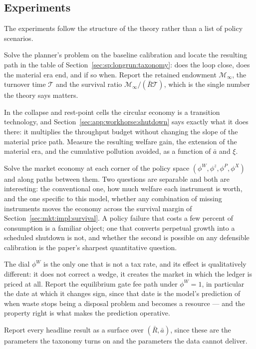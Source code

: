 \subsection{Experiments}\label{sec:q:cal:experiments}

The experiments follow the structure of the theory rather than a list of policy scenarios.

 Solve the planner's problem on the baseline calibration and locate the resulting path in the table of Section~\ref{sec:sp:longrun:taxonomy}: does the loop close, does the material era end, and if so when. Report the retained endowment $\mathcal M_\infty$, the turnover time $\mathcal T$ and the survival ratio $\mathcal M_\infty/\left(\bar R\mathcal T\right)$, which is the single number the theory says matters.

 In the collapse and rest-point cells the circular economy is a transition technology, and Section~\ref{sec:app:workhorse:shutdown} says exactly what it does there: it multiplies the throughput budget without changing the slope of the material price path. Measure the resulting welfare gain, the extension of the material era, and the cumulative pollution avoided, as a function of $\bar a$ and $\xi$.

 Solve the market economy at each corner of the policy space $\left(\phi^W,\phi^z,\phi^P,\phi^X\right)$ and along paths between them. Two questions are separable and both are interesting: the conventional one, how much welfare each instrument is worth, and the one specific to this model, whether any combination of missing instruments moves the economy across the survival margin of Section~\ref{sec:mkt:impl:survival}. A policy failure that costs a few percent of consumption is a familiar object; one that converts perpetual growth into a scheduled shutdown is not, and whether the second is possible on any defensible calibration is the paper's sharpest quantitative question.

 The dial $\phi^W$ is the only one that is not a tax rate, and its effect is qualitatively different: it does not correct a wedge, it creates the market in which the ledger is priced at all. Report the equilibrium gate fee path under $\phi^W=1$, in particular the date at which it changes sign, since that date is the model's prediction of when waste stops being a disposal problem and becomes a resource --- and the property right is what makes the prediction operative.

 Report every headline result as a surface over $\left(\bar R,\bar a\right)$, since these are the parameters the taxonomy turns on and the parameters the data cannot deliver.
